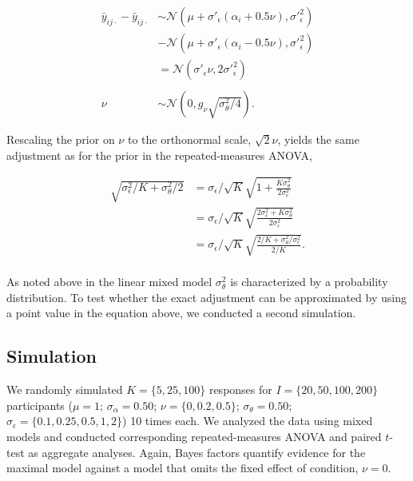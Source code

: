 \documentclass[
  man,floatsintext,draftall]{apa6}
\begin{document}
\[
\begin{aligned}
\bar{y}_{ij\cdot} - \bar{y}_{ij\cdot} & \sim \mathcal{N}(\mu + \sigma\prime_\epsilon (\alpha_i + 0.5 \nu), \sigma\prime_\epsilon^2) \\
& - \mathcal{N}(\mu + \sigma\prime_\epsilon (\alpha_i - 0.5 \nu), \sigma\prime_\epsilon^2) \\
  & = \mathcal{N}(\sigma\prime_\epsilon \nu, 2\sigma\prime_\epsilon^2) \\ & \\
  \nu & \sim \mathcal{N}(0, g_\nu \sqrt{\sigma_\theta^2/4}).
\end{aligned}
\]

Rescaling the prior on \(\nu\) to the orthonormal scale, \(\sqrt{2}\nu\), yields the same adjustment as for the prior in the repeated-measures ANOVA,

\[
\begin{aligned}
\sqrt{\sigma_\epsilon^2/K + \sigma_\theta^2/2} & = \sigma_\epsilon/\sqrt{K} \sqrt{1 + \frac{K\sigma^2_\theta}{2\sigma_\epsilon^2}} \\
  & = \sigma_\epsilon/\sqrt{K} \sqrt{\frac{2\sigma_\epsilon^2 + K\sigma^2_\theta}{2\sigma_\epsilon^2}} \\
  & = \sigma_\epsilon/\sqrt{K} \sqrt{\frac{2/K + \sigma^2_\theta/\sigma_\epsilon^2}{2/K}}. \\
\end{aligned}
\]

As noted above in the linear mixed model \(\sigma_\theta^2\) is characterized by a probability distribution.
To test whether the exact adjustment can be approximated by using a point value in the equation above, we conducted a second simulation.

\hypertarget{simulation-1}{%
\subsection{Simulation}\label{simulation-1}}

We randomly simulated \(K = \{5, 25, 100\}\) responses for \(I = \{20, 50, 100, 200\}\) participants (\(\mu = 1\); \(\sigma_\alpha = 0.50\); \(\nu = \{0, 0.2, 0.5\}\); \(\sigma_\theta = 0.50\); \(\sigma_\epsilon = \{0.1, 0.25, 0.5, 1, 2\}\)) 10 times each.
We analyzed the data using mixed models and conducted corresponding repeated-measures ANOVA and paired \(t\)-test as aggregate analyses.
Again, Bayes factors quantify evidence for the maximal model against a model that omits the fixed effect of condition, \(\nu = 0\).
\end{document}
